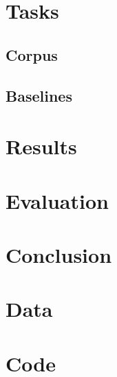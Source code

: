 \documentclass[a4paper, 12pt]{article}
\begin{document}
\section{Tasks}

\subsection{Corpus}

\subsection{Baselines}

\section{Results}

\section{Evaluation}

\section{Conclusion}

\clearpage
\printbibliography                      %

\clearpage
\appendix
\appendixpage                           %
\addappheadtotoc                        %

\section{Data}

\section{Code}
\end{document}
